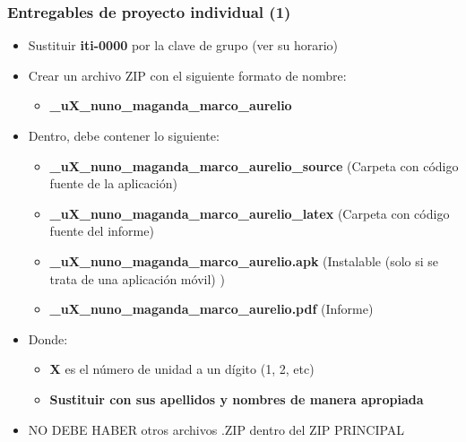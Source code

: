 

\begin{frame}
\frametitle{Entregables de proyecto individual (1)}
    \begin{itemize}
    \item Sustituir \textbf{iti-0000} por la clave de grupo (ver su horario) 
    \item Crear un archivo ZIP con el siguiente formato de nombre:
    \begin{itemize}
        \item \textbf{\clavegrupo\_uX\_nuno\_maganda\_marco\_aurelio}
    \end{itemize}
    \item Dentro, debe contener lo siguiente:
        \begin{itemize}
        \item \textbf{\clavegrupo\_uX\_nuno\_maganda\_marco\_aurelio\_source} (Carpeta con c\'odigo fuente de la aplicaci\'on)
        \item \textbf{\clavegrupo\_uX\_nuno\_maganda\_marco\_aurelio\_latex} (Carpeta con c\'odigo fuente del informe)
        \item \textbf{\clavegrupo\_uX\_nuno\_maganda\_marco\_aurelio.apk} (Instalable (solo si se trata de una aplicación móvil) )
        \item \textbf{\clavegrupo\_uX\_nuno\_maganda\_marco\_aurelio.pdf} (Informe)
        \end{itemize}
    \item Donde:
        \begin{itemize}
        \item \textbf{X} es el n\'umero de unidad a un d\'igito (1, 2, etc)
        \item \textbf{Sustituir con sus apellidos y nombres de manera apropiada} 
        \end{itemize}
	\item NO DEBE HABER otros archivos .ZIP dentro del ZIP PRINCIPAL
    \end{itemize}
\end{frame}


